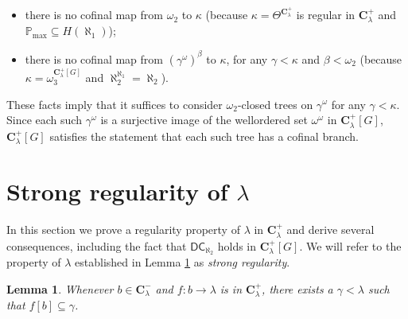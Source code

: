 \documentclass[12pt]{article}
\newtheorem{lemma}[theorem]{Lemma}
\def\bbC{{\mathbf{C}}}
\newcommand{\pmax}{\mathbb{P}_{\mathrm{max}}}
\newcommand{\breals}{\omega^{\omega}}
\newcommand{\DC}{\mathsf{DC}}
\newcommand{\cP}{\mathcal{P}}
\newcommand{\less}{\mathord{<}}
\newcommand{\restrict}{\mathord{\upharpoonright}}
\begin{document}
\begin{itemize}
\item there is no cofinal map from $\omega_{2}$ to $\kappa$ (because $\kappa = \Theta^{\bbC^{+}_{\lambda}}$ is regular in $\bbC^{+}_{\lambda}$ and $\pmax \subseteq H(\aleph_{1})$);

\item there is no cofinal map from $(\gamma^{\omega})^{\beta}$ to $\kappa$, for any $\gamma < \kappa$ and $\beta < \omega_{2}$ (because $\kappa = \omega_{3}^{\bbC^{+}_{\lambda}[G]}$ and $\aleph_{2}^{\aleph_{1}} = \aleph_{2}$).
\end{itemize}
These facts imply that it suffices to consider $\omega_{2}$-closed trees on $\gamma^{\omega}$ for any $\gamma < \kappa$.
Since each such $\gamma^{\omega}$ is a surjective image of the wellordered set $\breals$ in $\bbC^{+}_{\lambda}[G]$,
$\bbC^{+}_{\lambda}[G]$ satisfies the statement that each such tree has a cofinal branch.









\section{Strong regularity of $\lambda$}

In this section we prove a regularity property of $\lambda$ in $\bbC^{+}_{\lambda}$ and derive several consequences, including the fact that $\DC_{\aleph_{2}}$ holds in $\bbC^{+}_{\lambda}[G]$. We will refer to the property of $\lambda$ established in Lemma \ref{strongreglem} as \emph{strong regularity}.

\begin{lemma}\label{strongreglem} Whenever
$b\in \bbC^-_{\lambda}$ and $f \colon b \to \lambda$ is in $\bbC_{\lambda}^+$,  there exists a $\gamma<\lambda$ such that $f[b]\subseteq \gamma$.
\end{lemma}
\end{document}
